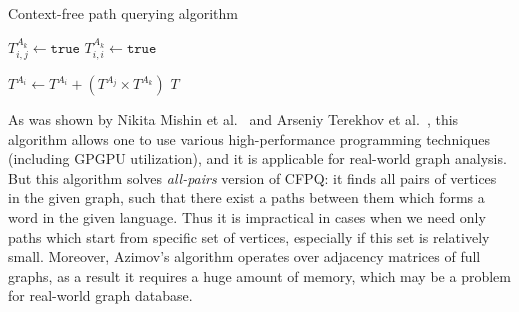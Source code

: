 {\footnotesize
\begin{algorithm}
\begin{algorithmic}[1]
\caption{Context-free path querying algorithm}
\label{alg:algo0}
          {$T^{A_k}_{i,j} \gets \texttt{true}$}
    \EndFor
            {$T^{A_k}_{i,i} \gets \texttt{true}$}
        \EndFor
    \EndFor

          { $T^{A_i} \gets T^{A_i} + (T^{A_j} \times T^{A_k})$ } 
        \EndFor
    \EndWhile
\State \Return $T$
\EndFunction
\end{algorithmic}
\end{algorithm}
}

As was shown by Nikita Mishin et al.~\cite{Mishin:2019:ECP:3327964.3328503} and Arseniy Terekhov et al.~\cite{ 10.1145/3398682.3399163}, this algorithm allows one to use various high-performance programming techniques (including GPGPU utilization), and it is applicable for real-world graph analysis.
But this algorithm solves \textit{all-pairs} version of CFPQ: it finds all pairs of vertices in the given graph, such that there exist a paths between them which forms a word in the given language.
Thus it is impractical in cases when we need only paths which start from specific set of vertices, especially if this set is relatively small. 
Moreover, Azimov's algorithm operates over adjacency matrices of full graphs, as a result it requires a huge amount of memory, which may be a problem for real-world graph database.